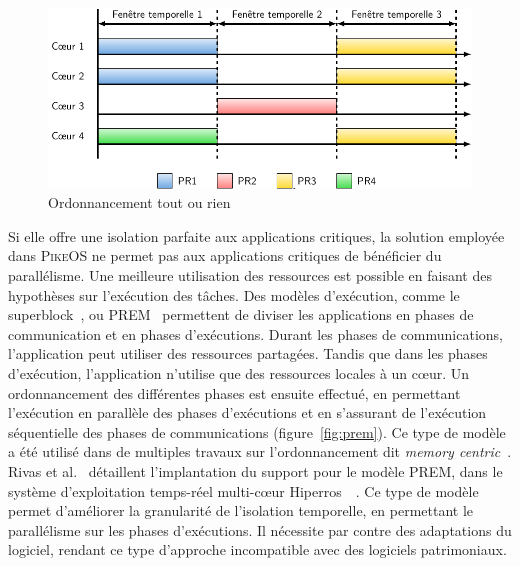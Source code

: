 
\begin{figure}
	\centering
	\includegraphics[width=\linewidth]{graphics/figures/tout_rien.pdf}
	\caption{\label{fig:tout_ou_rien}Ordonnancement tout ou rien}
\end{figure}

Si elle offre une isolation parfaite aux applications critiques, la solution employée dans \textsc{PikeOS} ne permet pas aux applications critiques de bénéficier du parallélisme.
Une meilleure utilisation des ressources est possible en faisant des hypothèses sur l'exécution des tâches.
Des modèles d'exécution, comme le superblock~\cite{durrieu2014predictable,schranzhofer2011timing}, ou PREM~\cite{pellizzoni2011predictable} permettent de diviser les applications en phases de communication et en phases d'exécutions.
Durant les phases de communications, l'application peut utiliser des ressources partagées.
Tandis que dans les phases d'exécution, l'application n'utilise que des ressources locales à un cœur.
Un ordonnancement des différentes phases est ensuite effectué, en permettant l'exécution en parallèle des phases d'exécutions et en s'assurant de l'exécution séquentielle des phases de communications (figure~\ref{fig:prem}).
Ce type de modèle a été utilisé dans de multiples travaux sur l'ordonnancement dit \emph{memory centric}~\cite{yao2012memory,2012_bak_memory,2014_alhammad_schedulability}.
Rivas et al.~\cite{rivas2019implementation} détaillent l'implantation du support pour le modèle PREM, dans le système d'exploitation temps-réel multi-cœur Hiperros~\cite{hipperos}~\cite{rivas2019implementation}.
Ce type de modèle permet d'améliorer la granularité de l'isolation temporelle, en permettant le parallélisme sur les phases d'exécutions.
Il nécessite par contre des adaptations du logiciel, rendant ce type d'approche incompatible avec des logiciels patrimoniaux.

